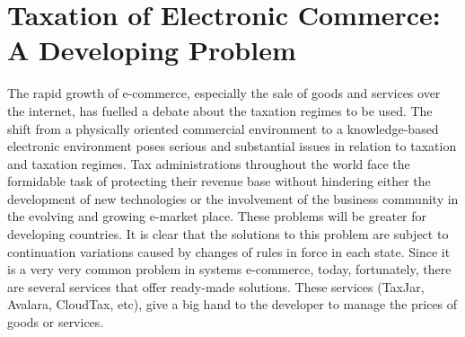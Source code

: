 \section{Taxation of Electronic Commerce: A Developing Problem}
\label{sec:taxation_overview}
The rapid growth of e-commerce, especially the sale of goods and services over the internet, has fuelled a debate about the taxation regimes to be used.
\newline
The shift from a physically oriented commercial environment to a knowledge-based electronic environment poses serious and substantial issues in relation to taxation and taxation regimes. Tax administrations throughout the world face the formidable task of protecting their revenue base without hindering either the development of new technologies or the involvement of the business community in the evolving and growing e-market place.
These problems will be greater for developing countries.
\newline
It is clear that the solutions to this problem are subject to continuation variations caused by changes of rules in force in each state.
\newline
Since it is a very very common problem in systems e-commerce, today, fortunately, there are several services that offer ready-made solutions.
\newline
These services (TaxJar, Avalara, CloudTax, etc), give a big hand to the developer to manage the prices of goods or services.
